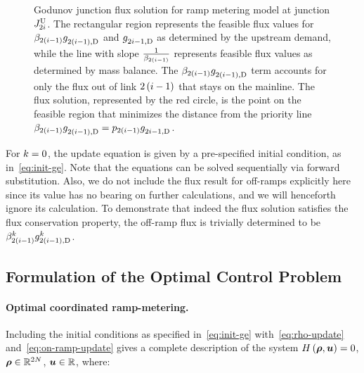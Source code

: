\begin{figure}
								\caption{Godunov junction flux solution for ramp metering model at junction
									$J_{2i}^{\text{U}}$. The rectangular region represents the feasible flux
									values for $\beta_{2\left(i-1\right)}g_{2\left(i-1\right),\text{D}}^{}$
									and $g_{2i-1,\text{D}}^{}$ as determined by the upstream demand, while
									the line with slope\label{fig:Godunov-junction-flux} $\frac{1}{\beta_{2\left(i-1\right)}}$
									represents feasible flux values as determined by mass balance. The
									$\beta_{2\left(i-1\right)}g_{2\left(i-1\right),\text{D}}^{}$
									term accounts for only the flux out of link $2\left(i-1\right)$
									that stays on the mainline. The flux solution, represented by the
									red circle, is the point on the feasible region that minimizes the
									distance from the priority line $\beta_{2\left(i-1\right)}g_{2\left(i-1\right),\text{D}}^{}=p_{2(i-1)}g_{2i-1,\text{D}}^{}$.}
							\end{figure}
														
														
							For $k=0$, the update equation is given by a pre-specified initial
							condition, as in~\eqref{eq:init-ge}. Note that the equations can
							be solved sequentially via forward substitution. Also, we do not include
							the flux result for off-ramps explicitly here since its value has no
							bearing on further calculations, and we will henceforth ignore its
							calculation. To demonstrate that indeed the flux solution satisfies
							the flux conservation property, the off-ramp flux is trivially determined
							to be $\beta_{2\left(i-1\right)}^{k}g_{2\left(i-1\right),\text{D}}^{k}$.
														
														
							\subsection{Formulation of the Optimal Control Problem}
														
														
							\paragraph{Optimal coordinated ramp-metering.}
														
							Including the initial conditions as specified in~\eqref{eq:init-ge}
							with~\eqref{eq:rho-update} and~\eqref{eq:on-ramp-update} gives
							a complete description of the system $\sys\left(\state,\control\right)=0$,
							$\state\in\mathbb{R}^{2\nlinks}$, $\control\in\mathbb{R}$, where:
														
